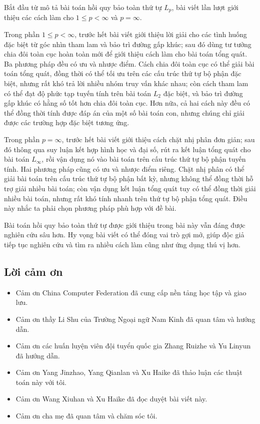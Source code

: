 \documentclass[11pt]{article}
\begin{document}
Bắt đầu từ mô tả bài toán hồi quy bảo toàn thứ tự \(L_p\), bài viết lần lượt
giới thiệu các cách làm cho \(1\le p<\infty\) và \(p=\infty\).

Trong phần \(1\le p<\infty\), trước hết bài viết giới thiệu lời giải cho các
tình huống đặc biệt từ góc nhìn tham lam và bảo trì đường gấp khúc; sau đó dùng
tư tưởng chia đôi toàn cục hoàn toàn mới để giới thiệu cách làm cho bài toán
tổng quát. Ba phương pháp đều có ưu và nhược điểm. Cách chia đôi toàn cục có
thể giải bài toán tổng quát, đồng thời có thể tối ưu trên các cấu trúc thứ tự
bộ phận đặc biệt, nhưng rất khó trả lời nhiều nhóm truy vấn khác nhau; còn cách
tham lam có thể đạt độ phức tạp tuyến tính trên bài toán \(L_2\) đặc biệt, và
bảo trì đường gấp khúc có hằng số tốt hơn chia đôi toàn cục. Hơn nữa, cả hai
cách này đều có thể đồng thời tính được đáp án của một số bài toán con, nhưng
chúng chỉ giải được các trường hợp đặc biệt tương ứng.

Trong phần \(p=\infty\), trước hết bài viết giới thiệu cách chặt nhị phân đơn
giản; sau đó thông qua suy luận kết hợp hình học và đại số, rút ra kết luận
tổng quát cho bài toán \(L_\infty\), rồi vận dụng nó vào bài toán trên cấu trúc
thứ tự bộ phận tuyến tính. Hai phương pháp cũng có ưu và nhược điểm riêng. Chặt
nhị phân có thể giải bài toán trên cấu trúc thứ tự bộ phận bất kỳ, nhưng không
thể đồng thời hỗ trợ giải nhiều bài toán; còn vận dụng kết luận tổng quát tuy
có thể đồng thời giải nhiều bài toán, nhưng rất khó tính nhanh trên thứ tự bộ
phận tổng quát. Điều này nhắc ta phải chọn phương pháp phù hợp với đề bài.

Bài toán hồi quy bảo toàn thứ tự được giới thiệu trong bài này vẫn đáng được
nghiên cứu sâu hơn. Hy vọng bài viết có thể đóng vai trò gợi mở, giúp độc giả
tiếp tục nghiên cứu và tìm ra nhiều cách làm cũng như ứng dụng thú vị hơn.

\subsection*{Lời cảm ơn}

\begin{itemize}
  \item Cảm ơn China Computer Federation đã cung cấp nền tảng học tập và giao
  lưu.
  \item Cảm ơn thầy Li Shu của Trường Ngoại ngữ Nam Kinh đã quan tâm và hướng
  dẫn.
  \item Cảm ơn các huấn luyện viên đội tuyển quốc gia Zhang Ruizhe và Yu Linyun
  đã hướng dẫn.
  \item Cảm ơn Yang Jinzhao, Yang Qianlan và Xu Haike đã thảo luận các thuật
  toán này với tôi.
  \item Cảm ơn Wang Xiuhan và Xu Haike đã đọc duyệt bài viết này.
  \item Cảm ơn cha mẹ đã quan tâm và chăm sóc tôi.
\end{itemize}
\end{document}

